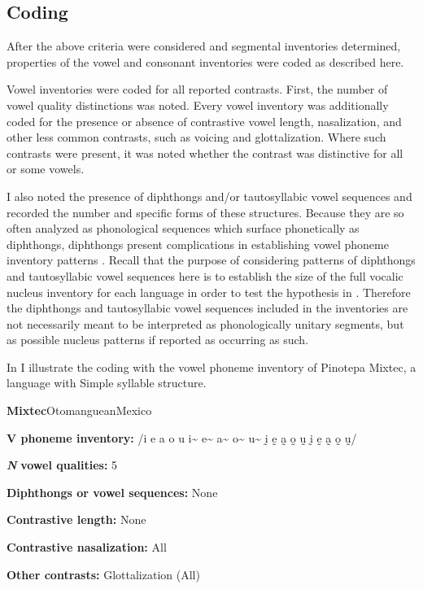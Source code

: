 \subsection{Coding}\label{sec:4.2.2}

  After the above criteria were considered and segmental inventories determined, properties of the vowel and consonant inventories were coded as described here.

  Vowel inventories were coded for all reported contrasts. First, the number of vowel quality distinctions was noted. Every vowel inventory was additionally coded for the presence or absence of contrastive vowel length, nasalization, and other less common contrasts, such as voicing and glottalization. Where such contrasts were present, it was noted whether the contrast was distinctive for all or some vowels. 

  I also noted the presence of diphthongs and/or tautosyllabic vowel sequences and recorded the number and specific forms of these structures. Because they are so often analyzed as phonological sequences which surface phonetically as diphthongs, diphthongs present complications in establishing vowel phoneme inventory patterns \citep[133]{Maddieson1984}. Recall that the purpose of considering patterns of diphthongs and tautosyllabic vowel sequences here is to establish the size of the full vocalic nucleus inventory for each language in order to test the hypothesis in . Therefore the diphthongs and tautosyllabic vowel sequences included in the inventories are not necessarily meant to be interpreted as phonologically unitary segments, but as possible nucleus patterns if reported as occurring as such.

  In  I illustrate the coding with the vowel phoneme inventory of Pinotepa Mixtec, a language with Simple syllable structure.

\ea\label{ex:4.9}
 \textbf{Mixtec}{Otomanguean}{Mexico}

\textbf{V phoneme inventory:} /i e a o u i\~{}  e\~{}  a\~{}  o\~{}  u\~{}  ḭ ḛ a̰ o̰ ṵ ḭ ḛ a̰ o̰ ṵ/

\textbf{\textit{N}} \textbf{vowel qualities:} 5

\textbf{Diphthongs or vowel sequences:} None

\textbf{Contrastive length:} None

\textbf{Contrastive nasalization:} All

\textbf{Other contrasts:} Glottalization (All)
\z

